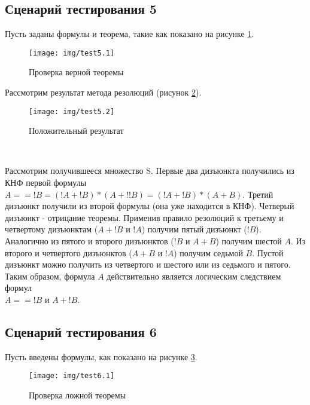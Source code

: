 \documentclass[12pt, a4paper]{article}
\begin{document}
	 \begin{center}
	 	\subsection{Сценарий тестирования 5}
	 \end{center} 
	 \par Пусть заданы формулы и теорема, такие как показано на рисунке \ref{fig:test5.1}.
	 \begin{figure}[h!]
	 	\centering
	 	\texttt{[image: img/test5.1]}
	 	\caption{Проверка верной теоремы}
	 	\label{fig:test5.1}
	 \end{figure}
	 \newpage
	 \par Рассмотрим результат метода резолюций (рисунок \ref{fig:test5.2}).
	 \begin{figure}[h!]
	 	\centering
	 	\texttt{[image: img/test5.2]}
	 	\caption{Положительный результат}
	 	\label{fig:test5.2}
	 \end{figure}\\
	 \par Рассмотрим получившееся множество S. Первые два дизъюнкта получились из КНФ первой формулы $A == !B = (!A + !B) * (A + !!B) = (!A + !B) * (A + B)$. Третий дизъюнкт получили из второй формулы (она уже находится в КНФ). Четверый дизъюнкт - отрицание теоремы. Применив правило резолюций к третьему и четвертому дизъюнктам ($A+!B$ и $!A$) получим пятый дизъюнкт ($!B$). Аналогично из пятого и второго дизъюнктов ($!B$ и $A+B$) получим шестой $A$. Из второго и четвертого дизъюнктов ($A+B$ и $!A$) получим седьмой $B$. Пустой дизъюнкт можно получить из четвертого и шестого или из седьмого и пятого. Таким образом, формула $A$ действительно является логическим следствием формул\\ $A==!B$ и $A+!B$.
	 
	 \begin{center}
	 	\subsection{Сценарий тестирования 6}
	 \end{center} 
	 \par Пусть введены формулы, как показано на рисунке \ref{fig:test6.1}.
	 \begin{figure}[h!]
	 	\centering
	 	\texttt{[image: img/test6.1]}
	 	\caption{Проверка ложной теоремы}
	 	\label{fig:test6.1}
	 \end{figure}
	 
\end{document}
